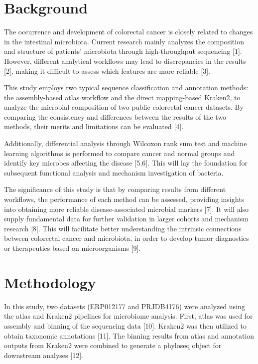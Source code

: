 \documentclass[
]{article}
\author{YNYK}
\date{2023-10-07}
\begin{document}
\hypertarget{background}{%
\section{Background}\label{background}}

The occurrence and development of colorectal cancer is closely related
to changes in the intestinal microbiota. Current research mainly
analyzes the composition and structure of patients' microbiota through
high-throughput sequencing {[}1{]}. However, different analytical
workflows may lead to discrepancies in the results {[}2{]}, making it
difficult to assess which features are more reliable {[}3{]}.

This study employs two typical sequence classification and annotation
methods: the assembly-based atlas workflow and the direct mapping-based
Kraken2, to analyze the microbial composition of two public colorectal
cancer datasets. By comparing the consistency and differences between
the results of the two methods, their merits and limitations can be
evaluated {[}4{]}.

Additionally, differential analysis through Wilcoxon rank sum test and
machine learning algorithms is performed to compare cancer and normal
groups and identify key microbes affecting the disease {[}5,6{]}. This
will lay the foundation for subsequent functional analysis and mechanism
investigation of bacteria.

The significance of this study is that by comparing results from
different workflows, the performance of each method can be assessed,
providing insights into obtaining more reliable disease-associated
microbial markers {[}7{]}. It will also supply fundamental data for
further validation in larger cohorts and mechanism research {[}8{]}.
This will facilitate better understanding the intrinsic connections
between colorectal cancer and microbiota, in order to develop tumor
diagnostics or therapeutics based on microorganisms {[}9{]}.

\hypertarget{methodology}{%
\section{Methodology}\label{methodology}}

In this study, two datasets (ERP012177 and PRJDB4176) were analyzed
using the atlas and Kraken2 pipelines for microbiome analysis. First,
atlas was used for assembly and binning of the sequencing data {[}10{]}.
Kraken2 was then utilized to obtain taxonomic annotations {[}11{]}. The
binning results from atlas and annotation outputs from Kraken2 were
combined to generate a phyloseq object for downstream analyses {[}12{]}.
\end{document}
